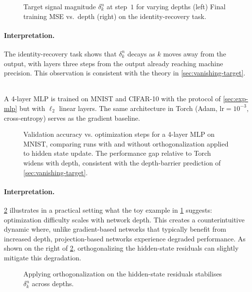 \begin{figure}[ht]
\centering
{}
\caption{
Target signal magnitude $\delta_k^{n}$ at
step~$1$ for varying depths (left) Final training MSE vs.\ depth
(right) on the identity-recovery task.
}
\label{fig:depth-barrier}
\end{figure}

\paragraph{Interpretation.}
The identity-recovery task shows that $\delta_k^{n}$ decays as $k$ moves away from the output, with layers three steps from the output already reaching machine precision. This observation is consistent with the theory in \cref{sec:vanishing-target}. 
\begin{tcolorbox}[reprocard, title=Setup] \\
A 4-layer MLP is trained on MNIST and CIFAR-10 with the protocol of \cref{sec:exp-mlp} but with $\ell_2$ linear layers. The same architecture in Torch (Adam, $\text{lr} = 10^{-3}$, cross-entropy) serves as the gradient baseline.
\end{tcolorbox}
\begin{figure}[ht]
    \centering
    \caption{Validation accuracy vs. optimization steps for a 4-layer MLP on MNIST, comparing runs with and without orthogonalization applied to hidden state update. The performance gap relative to Torch widens with depth, consistent with the depth-barrier prediction of \cref{sec:vanishing-target}.}
    \label{fig:deep_mlp_muon_comparison}
\end{figure}
\paragraph{Interpretation.} \cref{fig:deep_mlp_muon_comparison} illustrates in a
practical setting what the toy example in \cref{fig:depth-barrier} suggests:
optimization difficulty scales with network depth. This creates a counterintuitive
dynamic where, unlike gradient-based networks that typically benefit from increased
depth, projection-based networks experience degraded performance. As shown on the
right of \cref{fig:deep_mlp_muon_comparison}, orthogonalizing the hidden-state
residuals can slightly mitigate this degradation.

\begin{figure}[ht]
    \centering
    \caption{Applying orthogonalization on the hidden-state residuals stabilises
    $\delta_k^{n}$ across depths.}
    \label{fig:orthogonalization}
\end{figure}

